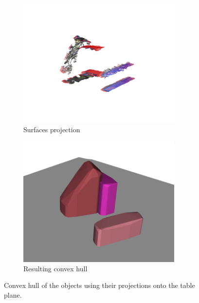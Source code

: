 \begin{figure}[tb]
\centering
\begin{subfigure}[t]{0.45\textwidth}
\centering
\includegraphics[width=0.9\textwidth]{Img/convexhull/projection.png}
\caption{Surfaces projection}\label{fig:projection}
\end{subfigure}
\begin{subfigure}[t]{0.45\textwidth}
\centering
\includegraphics[width=0.9\textwidth]{Img/convexhull/full_convexhull2.png}
\caption{Resulting convex hull}\label{fig:full_convexhull_}
\end{subfigure}
\caption{Convex hull of the objects using their projections onto the table plane.}\label{fig:full_convexhull}
\end{figure}


